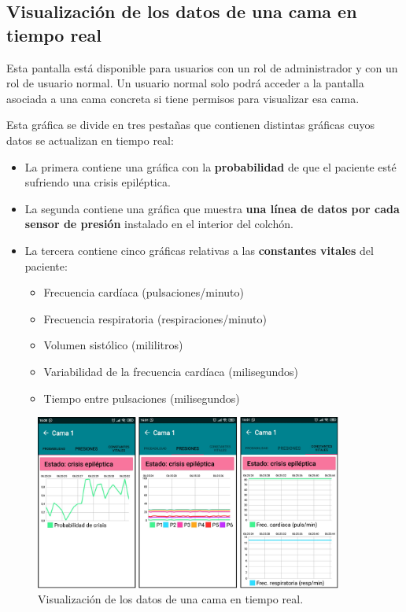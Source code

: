 \subsection{Visualización de los datos de una cama en tiempo real}

Esta pantalla está disponible para usuarios con un rol de administrador y con un rol de usuario normal. Un usuario normal solo podrá acceder a la pantalla asociada a una cama concreta si tiene permisos para visualizar esa cama. 

Esta gráfica se divide en tres pestañas que contienen distintas gráficas cuyos datos se actualizan en tiempo real: 

\begin{itemize}
	\item La primera contiene una gráfica con la \textbf{probabilidad} de que el paciente esté sufriendo una crisis epiléptica. 
	\item La segunda contiene una gráfica que muestra \textbf{una línea de datos por cada sensor de presión} instalado en el interior del colchón. 
	\item La tercera contiene cinco gráficas relativas a las \textbf{constantes vitales} del paciente: 
	\begin{itemize}
		\item Frecuencia cardíaca (pulsaciones/minuto)
		\item Frecuencia respiratoria (respiraciones/minuto)
		\item Volumen sistólico (mililitros)
		\item Variabilidad de la frecuencia cardíaca (milisegundos)
		\item Tiempo entre pulsaciones (milisegundos)
	\end{itemize}
\end{itemize}

\begin{figure}[H]
	\centering
	\includegraphics[width=0.9\textwidth]{../img/datoscama.png}
	\caption{Visualización de los datos de una cama en tiempo real.}
	\label{fig:datoscama}
\end{figure}

